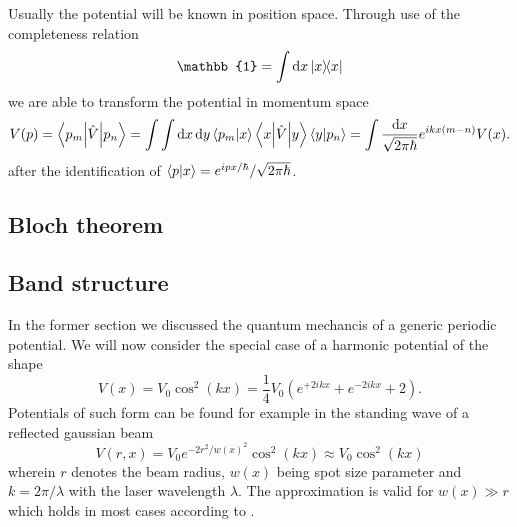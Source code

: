 Usually the potential will be known in position space. Through use of the
completeness relation
\begin{equation}
  \mathbb{1}
  =\int\dd{x}\op{x}{x}
  \label{eq:continous_completeness_relation}
\end{equation}
we are able to transform the potential in momentum space
\begin{equation}
  V(p)
  =\mel**{p_m}{\hat{V}}{p_n}
  =\int\int\dd{x}\dd{y}\braket{p_m}{x}\mel**{x}{\hat{V}}{y}\braket{y}{p_n}
  =\int\frac{\dd{x}}{\sqrt{2\pi\hbar}}e^{ikx(m-n)}V(x)
  \label{eq:potential_fourier_transform}.
\end{equation}
after the identification of $\braket{p}{x}=e^{ipx/\hbar}/\sqrt{2\pi\hbar}$.

\subsection{Bloch theorem}

\subsection{Band structure}

In the former section we discussed the quantum mechancis of a generic
periodic potential. We will now consider the special case of a harmonic
potential of the shape
\begin{equation}
  V(x)
  =V_0\cos^2(kx)
  =\frac{1}{4}V_0\left(e^{+2ikx}+e^{-2ikx}+2\right)
  \label{eq:harmonic_potential}.
\end{equation}
Potentials of such form can be found for example in the standing wave of a
reflected gaussian beam
\begin{equation}
  V(r,x)
  =V_0e^{-2r^2/w(x)^2}\cos^2(kx)
  \approx V_0\cos^2(kx)
  \label{eq:optical_potential}
\end{equation}
wherein $r$ denotes the beam radius, $w(x)$ being spot size parameter and
$k=2\pi/\lambda$ with the laser wavelength $\lambda$. The approximation is
valid for $w(x)\gg r$ which holds in most cases according to
\cite[p.127]{Rom2009}.

